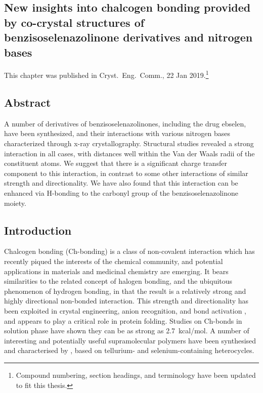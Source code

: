 \begin{refsection}

    \chapter[Insights from co-crystal structures]{New insights into chalcogen bonding provided by co-crystal structures of benzisoselenazolinone derivatives and nitrogen bases}\label{sec:crystengcomm1}
    
    This chapter was published in Cryst.\ Eng.\ Comm., 22 Jan 2019\autocite{Fellowes2019}.\footnote{Compound numbering, section headings, and terminology have been updated to fit this thesis.}
    
    \section{Abstract}
    A number of derivatives of benzisoselenazolinones, including the drug ebselen, have been synthesized, and their interactions with various nitrogen bases characterized through x-ray crystallography.
    Structural studies revealed a strong interaction in all cases, with  distances well within the Van der Waals radii of the constituent atoms.
    We suggest that there is a significant charge transfer component to this interaction, in contrast to some other interactions of similar strength and directionality.
    We have also found that this interaction can be enhanced via H-bonding to the carbonyl group of the benzisoselenazolinone moiety.
    
    
    \section{Introduction}
    Chalcogen bonding (Ch-bonding) is a class of non-covalent interaction which has recently piqued the interests of the chemical community, and potential applications in materials and medicinal chemistry are emerging.\autocite{Mitchell2017,Wonner2017a,Fanfrlik2014,Vogel2019}
    It bears similarities to the related concept of halogen bonding, and the ubiquitous phenomenon of hydrogen bonding, in that the result is a relatively strong and highly directional non-bonded interaction.\autocite{Paolo1974}
    This strength and directionality has been exploited in crystal engineering\autocite{Gleiter2003,Kremer2016,Huynh2017}, anion recognition\autocite{Lim2017,Lim2018,Garrett2016}, and bond activation \autocite{Wonner2017,Benz2017,Benz2017a}, and appears to play a critical role in protein folding.\autocite{Iwaoka2001,Iwaoka2015}
    Studies on  Ch-bonds in solution phase have shown they can be as strong as 2.7~kcal/mol\autocite{Garrett2015a}.
    A number of interesting and potentially useful supramolecular polymers have been synthesised and characterised by \citeauthor{Ho2016,Ho2017}, based on tellurium- and selenium-containing heterocycles.\autocite{Ho2016,Ho2017}
    

\end{refsection}
